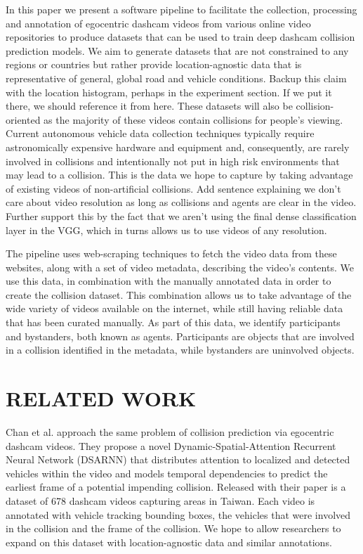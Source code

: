 \documentclass[letterpaper, 10 pt, conference]{ieeeconf}
\newcommand{\todo}[1]{{\color{red}#1}}
\begin{document}
In this paper we present a software pipeline to facilitate the collection, processing and annotation of egocentric dashcam videos from various online video repositories to produce datasets that can be used to train deep dashcam collision prediction models.
We aim to generate datasets that are not constrained to any regions or countries but rather provide location-agnostic data that is representative of general, global road and vehicle conditions. \todo{Backup this claim with the location histogram, perhaps in the experiment section. If we put it there, we should reference it from here.}
These datasets will also be collision-oriented as the majority of these videos contain collisions for people's viewing.
Current autonomous vehicle data collection techniques typically require astronomically expensive hardware and equipment and, consequently, are rarely involved in collisions and intentionally not put in high risk environments that may lead to a collision.
This is the data we hope to capture by taking advantage of existing videos of non-artificial collisions. \todo{Add sentence explaining we don't care about video resolution as long as collisions and agents are clear in the video. Further support this by the fact that we aren't using the final dense classification layer in the VGG, which in turns allows us to use videos of any resolution. }

The pipeline uses web-scraping techniques to fetch the video data from these websites, along with a set of video metadata, describing the video's contents.
We use this data, in combination with the manually annotated data in order to create the collision dataset.
This combination allows us to take advantage of the wide variety of videos available on the internet, while still having reliable data that has been curated manually.
As part of this data, we identify participants and bystanders, both known as agents. Participants are objects that are involved in a collision identified in the metadata, while bystanders are uninvolved objects.

\section{RELATED WORK}

Chan et al. \cite{chan2016anticipating} approach the same problem of collision prediction via egocentric dashcam videos. They propose a novel Dynamic-Spatial-Attention Recurrent Neural Network (DSARNN) that distributes attention to localized and detected vehicles within the video and models temporal dependencies to predict the earliest frame of a potential impending collision. Released with their paper is a dataset of 678 dashcam videos capturing areas in Taiwan. Each video is annotated with vehicle tracking bounding boxes, the vehicles that were involved in the collision and the frame of the collision. We hope to allow researchers to expand on this dataset with location-agnostic data and similar annotations.
\end{document}
